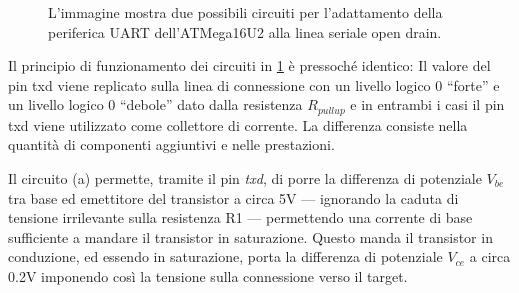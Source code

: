 \begin{figure}[t]
    \centering

    \caption[]{L'immagine mostra due possibili circuiti per l'adattamento della periferica UART dell'ATMega16U2 alla linea seriale open drain.}\label{fig:od-impl}
\end{figure}

Il principio di funzionamento dei circuiti in \cref{fig:od-impl} è pressoché identico: Il valore del pin txd viene replicato sulla linea di connessione con un livello logico 0 ``forte'' e un livello logico 0 ``debole'' dato dalla resistenza \(R_{pullup}\) e in entrambi i casi il pin txd viene utilizzato come collettore di corrente.
La differenza consiste nella quantità di componenti aggiuntivi e nelle prestazioni.

Il circuito (a) permette, tramite il pin \textit{txd}, di porre la differenza di potenziale \(V_{be}\) tra base ed emettitore del transistor a circa 5V --- ignorando la caduta di tensione irrilevante sulla resistenza R1 --- permettendo una corrente di base sufficiente a mandare il transistor in saturazione. Questo manda il transistor in conduzione, ed essendo in saturazione, porta la differenza di potenziale \(V_{ce}\) a circa 0.2V imponendo così la tensione sulla connessione verso il target.

